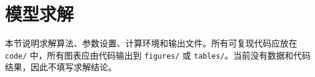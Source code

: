 \section{模型求解}

本节说明求解算法、参数设置、计算环境和输出文件。所有可复现代码应放在 \texttt{code/} 中，所有图表应由代码输出到 \texttt{figures/} 或 \texttt{tables/}。当前没有数据和代码结果，因此不填写求解结论。
